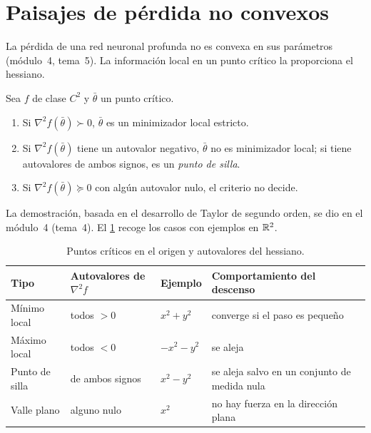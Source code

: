 \section{Paisajes de pérdida no convexos}

La pérdida de una red neuronal profunda no es convexa en sus parámetros (módulo~4, tema~5). La información local en un punto crítico la proporciona el hessiano.

\begin{proposicion}\label{prop:clasificacion}
Sea $f$ de clase $C^{2}$ y $\bar\theta$ un punto crítico.
\begin{enumerate}
  \item Si $\nabla^{2}f(\bar\theta)\succ 0$, $\bar\theta$ es un minimizador local estricto.
  \item Si $\nabla^{2}f(\bar\theta)$ tiene un autovalor negativo, $\bar\theta$ no es minimizador local; si tiene autovalores de ambos signos, es un \emph{punto de silla}.
  \item Si $\nabla^{2}f(\bar\theta)\succeq 0$ con algún autovalor nulo, el criterio no decide.
\end{enumerate}
\end{proposicion}

La demostración, basada en el desarrollo de Taylor de segundo orden, se dio en el módulo~4 (tema~4). El \cref{tab:criticos} recoge los casos con ejemplos en $\mathbb{R}^{2}$.

\begin{table}[h]
\centering\small
\caption{Puntos críticos en el origen y autovalores del hessiano.}\label{tab:criticos}
\begin{tabular}{@{}llll@{}}
\toprule
Tipo & Autovalores de $\nabla^{2}f$ & Ejemplo & Comportamiento del descenso \\
\midrule
Mínimo local & todos $>0$ & $x^{2}+y^{2}$ & converge si el paso es pequeño \\
Máximo local & todos $<0$ & $-x^{2}-y^{2}$ & se aleja \\
Punto de silla & de ambos signos & $x^{2}-y^{2}$ & se aleja salvo en un conjunto de medida nula \\
Valle plano & alguno nulo & $x^{2}$ & no hay fuerza en la dirección plana \\
\bottomrule
\end{tabular}
\end{table}

\addtocounter{definicion}{1}%

